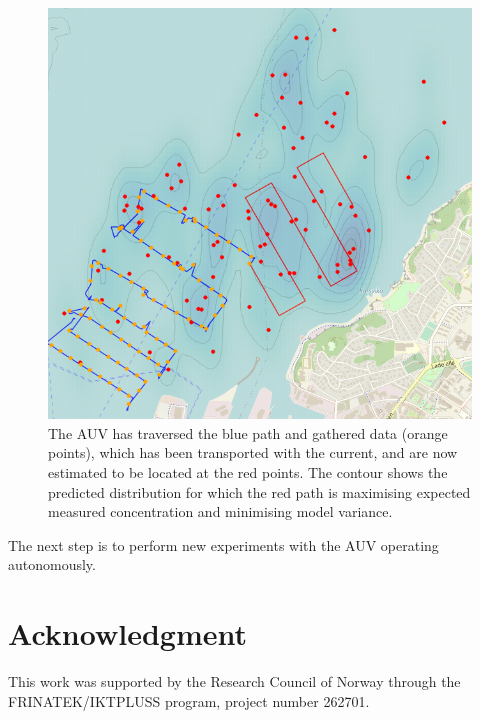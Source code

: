 \documentclass[conference]{IEEEtran}
\begin{document}
\begin{figure}[tbp]
\centerline{\includegraphics[width=\linewidth]{figures/munkholmen_planned_path.png}}
\caption{The AUV has traversed the blue path and gathered data (orange points), which has been transported with the current, and are now estimated to be located at the red points.
The contour shows the predicted distribution for which the red path is maximising expected measured concentration and minimising model variance.}
\label{fig:munkholmen}
\end{figure}

The next step is to perform new experiments with the AUV operating autonomously.
\section*{Acknowledgment}
This work was supported by the Research Council of Norway through the FRINATEK/IKTPLUSS program, project number 262701.
\end{document}
